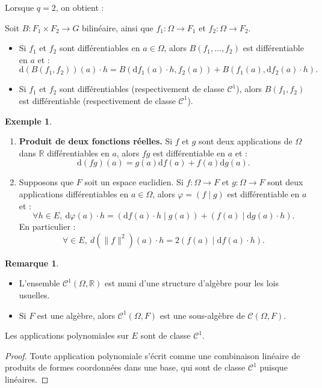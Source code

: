 \documentclass[french]{article}
\newcommand{\R}{\mathbb{R}}
\renewcommand{\d}{\text{d}}
\theoremstyle{plain}
\theoremstyle{definition}
\newtheorem*{ex}{Exemple}
\newtheorem*{rmq}{Remarque}
\theoremstyle{remark}
\begin{document}
Lorsque $q=2$, on obtient :

\begin{cor}%
	Soit $B: F_1\times F_2\to G$ bilinéaire, ainsi que $f_1:\Omega\to F_1$ et $f_2:\Omega\to F_2$.
	\begin{itemize}
		\item Si $f_1$ et $f_2$ sont différentiables en $a\in\Omega$, alors $B(f_1,\ldots,f_2)$ est différentiable en $a$ et :
		$$\d(B(f_1,f_2))(a)\cdot h=B(\d f_1(a)\cdot h, f_2(a))+B(f_1(a),\d f_2(a)\cdot h).$$
		\item Si $f_1$ et $f_2$ sont différentiables (respectivement de classe $\mathcal{C}^1$), alors $B(f_1,f_2)$ est différentiable (respectivement de classe $\mathcal{C}^1$).
	\end{itemize}
\end{cor}

\begin{ex}
	\begin{enumerate}
		\item \textbf{Produit de deux fonctions réelles.} Si $f$ et $g$ sont deux applications de $\Omega$ dans $\R$ différentiables en $a$, alors $fg$ est différentiable en $a$ et :
		$$\d (fg)(a)=g(a)\d f(a)+f(a)\d g(a).$$
		\item Supposons que $F$ soit un espace euclidien. Si $f:\Omega\to F$ et $g:\Omega\to F$ sont deux applications différentiables en $a\in\Omega$, alors $\varphi=(f\mid g)$ est différentiable en $a$ et :
		$$\forall h\in E,\ \d\varphi(a)\cdot h=(\d f(a)\cdot h\mid g(a))+(f(a)\mid\d g(a)\cdot h).$$
		En particulier :
		$$\forall\in E,\ d(\lVert f\rVert^2)(a)\cdot h=2(f(a)\mid\d f(a)\cdot h).$$
	\end{enumerate}
\end{ex}

\begin{rmq}
	\begin{itemize}
		\item L'ensemble $\mathcal{C}^1(\Omega,\R)$ est muni d'une structure d'algèbre pour les lois usuelles.
		\item Si $F$ est une algèbre, alors $\mathcal{C}^1(\Omega,F)$ est une sous-algèbre de $\mathcal{C}(\Omega,F)$.
	\end{itemize}
\end{rmq}

\begin{prop}%
	Les applications polynomiales sur $E$ sont de classe $\mathcal{C}^1$.
\end{prop}
\begin{proof}
	Toute application polynomiale s'écrit comme une combinaison linéaire de produits de formes coordonnées dans une base, qui sont de classe $\mathcal{C}^1$ puisque linéaires.
\end{proof}
\end{document}
